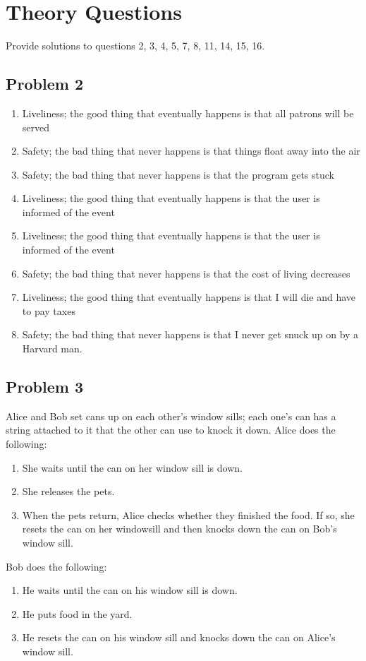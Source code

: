 \documentclass[]{article}
\begin{document}
\section{Theory Questions}
Provide solutions to questions 2, 3, 4, 5, 7, 8, 11, 14, 15, 16.

\subsection{Problem 2}
\begin{enumerate}
	\item Liveliness; the good thing that eventually happens is that all patrons will be served
	\item Safety; the bad thing that never happens is that things float away into the air
	\item Safety; the bad thing that never happens is that the program gets stuck
	\item Liveliness; the good thing that eventually happens is that the user is informed of the event
	\item Liveliness; the good thing that eventually happens is that the user is informed of the event
	\item Safety; the bad thing that never happens is that the cost of living decreases
	\item Liveliness; the good thing that eventually happens is that I will die and have to pay taxes 
	\item Safety; the bad thing that never happens is that I never get snuck up on by a Harvard man.
\end{enumerate}
\subsection{Problem 3}
Alice and Bob set cans up on each other's window sills; each one's can has a string attached to it that the other can use to knock it down.
Alice does the following:
\begin{enumerate}
	\item She waits until the can on her window sill is down.
	\item She releases the pets.
	\item When the pets return, Alice checks whether they finished the food. If so, she resets the can on her windowsill and then knocks down the can on Bob's window sill.
\end{enumerate}
Bob does the following:
\begin{enumerate}
	\item He waits until the can on his window sill is down.
	\item He puts food in the yard.
	\item He resets the can on his window sill and knocks down the can on Alice's window sill.
\end{enumerate}
\end{document}

